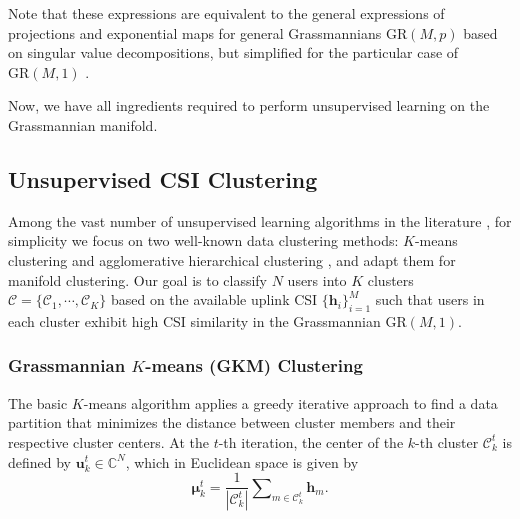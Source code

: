 Note that these expressions are equivalent to the general expressions of projections and exponential maps for general Grassmannians $\mathrm{GR}(M,p)$ based on singular value decompositions, but simplified for the particular case of $\mathrm{GR}(M,1)$ \cite{Absil2008book}.

Now, we have all ingredients required to perform unsupervised learning on the Grassmannian manifold. 


\subsection{Unsupervised CSI Clustering} \label{ssec:USCH_clustering}

Among the vast number of unsupervised learning algorithms in the literature \cite{usama19}, for simplicity we focus on two well-known data clustering methods: $K$-means clustering and agglomerative hierarchical clustering \cite{Xu15}, and adapt them for manifold clustering.
Our goal is to classify $N$ users into $K$ clusters $\mathcal{C}=\{\mathcal{C}_1, \cdots, \mathcal{C}_K\}$
based on the available uplink CSI $\{\bm{h}_i\}_{i=1}^M$
such that users in each cluster exhibit high CSI similarity
in the Grassmannian $\mathrm{GR}(M,1)$.


\subsubsection{Grassmannian $K$-means (GKM) Clustering } 
The basic $K$-means algorithm applies a greedy iterative approach to find a data partition that minimizes the distance between cluster members and their respective cluster centers. 
At the $t$-th iteration, the center of the $k$-th cluster $\mathcal{C}_k^t$ is defined by ${\bm{u}}_k^t \in \mathbb{C}^{N}$, which in Euclidean space is given by 
\begin{equation}
	{{\bm{\mu}}_k^t} = \frac{1}{{\left| {{\mathcal{C}_k^t}} \right|}}\sum\nolimits_{m \in {\mathcal{C}_k^t}} {{{\bm{h}}_{m}} } .\label{eqn:euclidean_centers}
\end{equation}

